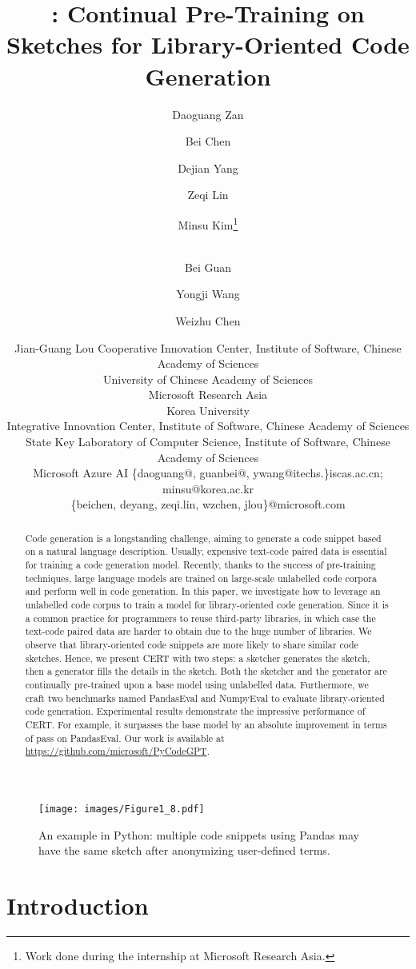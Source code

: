 \documentclass{article}
\title{\cert: Continual Pre-Training on Sketches for Library-Oriented Code Generation}
\author{
Daoguang Zan\and
Bei Chen\and
Dejian Yang\and
Zeqi Lin\and
Minsu Kim\thanks{Work done during the internship at Microsoft Research Asia.}\and\\
Bei Guan\and
Yongji Wang\and
Weizhu Chen\and
Jian-Guang Lou
\affiliations
Cooperative Innovation Center, Institute of Software, Chinese Academy of Sciences\\
University of Chinese Academy of Sciences\\ 
Microsoft Research Asia\\ 
Korea University\\
Integrative Innovation Center, Institute of Software, Chinese Academy of Sciences\\
State Key Laboratory of Computer Science, Institute of Software, Chinese Academy of Sciences\\
Microsoft Azure AI
\emails
\{daoguang@, guanbei@, ywang@itechs.\}iscas.ac.cn; minsu@korea.ac.kr\\
\{beichen, deyang, zeqi.lin, wzchen, jlou\}@microsoft.com
}
\newcommand{\cert}{\textsc{CERT}\xspace}
\newcommand{\peval}{PandasEval\xspace}
\newcommand{\neval}{NumpyEval\xspace}
\newcommand{\pandas}{Pandas\xspace}
\begin{document}
\maketitle

\begin{abstract}

Code generation is a longstanding challenge, aiming to generate a code snippet based on a natural language description. Usually, expensive text-code paired data is essential for training a code generation model. Recently, thanks to the success of pre-training techniques, large language models are trained on large-scale unlabelled code corpora and perform well in code generation. In this paper, we investigate how to leverage an unlabelled code corpus to train a model for library-oriented code generation. Since it is a common practice for programmers to reuse third-party libraries, in which case the text-code paired data are harder to obtain due to the huge number of libraries. We observe that library-oriented code snippets are more likely to share similar code sketches. Hence, we present \cert with two steps: a sketcher generates the sketch, then a generator fills the details in the sketch. Both the sketcher and the generator are continually pre-trained upon a base model using unlabelled data. Furthermore, we craft two benchmarks named \peval and \neval to evaluate library-oriented code generation. Experimental results demonstrate the impressive performance of \cert. For example, it surpasses the base model by an absolute  improvement in terms of pass on \peval. Our work is available at \url{https://github.com/microsoft/PyCodeGPT}.

\end{abstract}

\begin{figure}[t]
    \small
    \centering
    \texttt{[image: images/Figure1\_8.pdf]}
\caption{ An example in Python: multiple code snippets using \pandas may have the same sketch after anonymizing user-defined terms.
    }
    \label{fig:figure1}
\end{figure}

\section{Introduction} \label{introduction}
\end{document}

